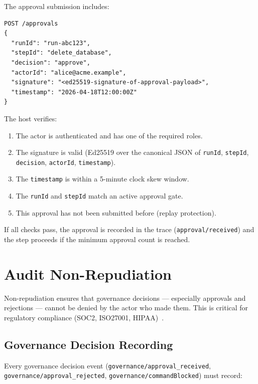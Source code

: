 The approval submission includes:

\begin{verbatim}
POST /approvals
{
  "runId": "run-abc123",
  "stepId": "delete_database",
  "decision": "approve",
  "actorId": "alice@acme.example",
  "signature": "<ed25519-signature-of-approval-payload>",
  "timestamp": "2026-04-18T12:00:00Z"
}
\end{verbatim}

The host verifies:

\begin{enumerate}
  \item The actor is authenticated and has one of the required roles.
  \item The signature is valid (Ed25519 over the canonical JSON of
        \texttt{runId}, \texttt{stepId}, \texttt{decision}, \texttt{actorId},
        \texttt{timestamp}).
  \item The \texttt{timestamp} is within a 5-minute clock skew window.
  \item The \texttt{runId} and \texttt{stepId} match an active approval gate.
  \item This approval has not been submitted before (replay protection).
\end{enumerate}

If all checks pass, the approval is recorded in the trace
(\texttt{approval/received}) and the step proceeds if the minimum approval
count is reached.

\section{Audit Non-Repudiation}
\label{sec:audit-nonrepudiation}

Non-repudiation ensures that governance decisions — especially approvals and
rejections — cannot be denied by the actor who made them.  This is critical for
regulatory compliance (SOC2, ISO27001, HIPAA)~\cite{soc2-aicpa,iso27001,hipaa-security-rule}.

\subsection{Governance Decision Recording}

Every governance decision event (\texttt{governance/approval\_received},
\texttt{governance/approval\_rejected}, \texttt{governance/commandBlocked})
must record:

